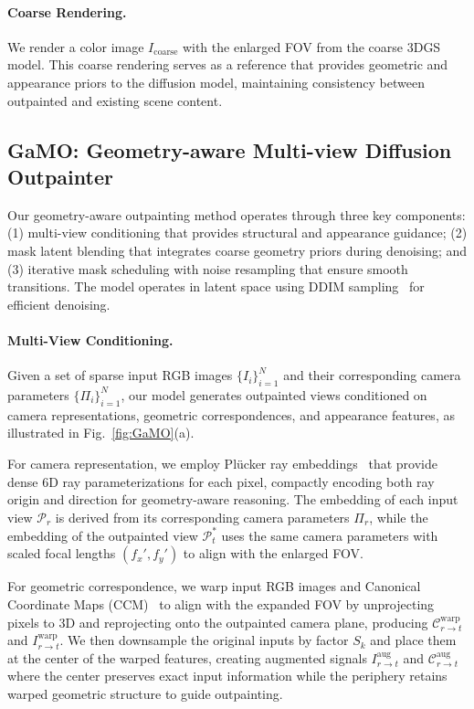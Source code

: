 \documentclass[runningheads]{llncs}
\begin{document}
\paragraph{Coarse Rendering.}
We render a color image $I_{\text{coarse}}$ with the enlarged FOV from the coarse 3DGS model. This coarse rendering serves as a reference that provides geometric and appearance priors to the diffusion model, maintaining consistency between outpainted and existing scene content.

\subsection{GaMO: Geometry-aware Multi-view Diffusion Outpainter}
\label{sec:GaMO}

\noindent Our geometry-aware outpainting method operates through three key components: (1) multi-view conditioning that provides structural and appearance guidance; (2) mask latent blending that integrates coarse geometry priors during denoising; and (3) iterative mask scheduling with noise resampling that ensure smooth transitions. The model operates in latent space using DDIM sampling~\cite{song2021denoising} for efficient denoising.


\paragraph{Multi-View Conditioning.}
Given a set of sparse input RGB images $\{I_i\}_{i=1}^N$ and their corresponding camera parameters $\{\Pi_i\}_{i=1}^N$, our model generates outpainted views conditioned on camera representations, geometric correspondences, and appearance features, as illustrated in Fig.~\ref{fig:GaMO}(a).

For camera representation, we employ Plücker ray embeddings~\cite{xu2024dmv3d} that provide dense 6D ray parameterizations for each pixel, compactly encoding both ray origin and direction for geometry-aware reasoning. The embedding of each input view $\mathcal{P}_r$ is derived from its corresponding camera parameters $\Pi_r$, while the embedding of the outpainted view $\mathcal{P}_t^*$ uses the same camera parameters with scaled focal lengths $(f_x', f_y')$ to align with the enlarged FOV.



For geometric correspondence, we warp input RGB images and Canonical Coordinate 
Maps (CCM)~\cite{li2024sweetdreamer} to align with the expanded FOV by unprojecting pixels to 3D and 
reprojecting onto the outpainted camera plane, producing $\mathcal{C}_{r \rightarrow t}^{\text{warp}}$ 
and $I_{r \rightarrow t}^{\text{warp}}$. We then downsample the original inputs 
by factor $S_k$ and place them at the center of the warped features, creating 
augmented signals $I_{r \rightarrow t}^{\text{aug}}$ and $\mathcal{C}_{r \rightarrow t}^{\text{aug}}$ 
where the center preserves exact input information while the periphery retains 
warped geometric structure to guide outpainting.
\end{document}
